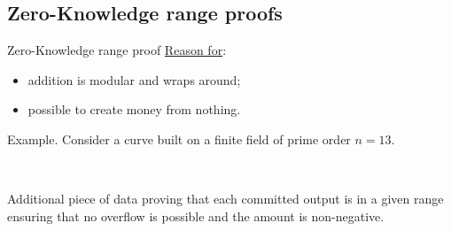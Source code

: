 \documentclass[usenames,dvipsnames]{beamer}
\begin{document}
    \subsection{Zero-Knowledge range proofs}
    \begin{frame}{Zero-Knowledge range proof}
        \underline{Reason for}:
        \begin{itemize}
            \item addition is modular and wraps around;
            \item possible to create money from nothing.
        \end{itemize}
    \begin{block}{Example.}
    Consider a curve built on a finite field of prime order $n=13$.\\ \ \\
    \end{block}
    \begin{columns}
    \begin{column}{0.5\linewidth}
    \end{column}
    \begin{column}{0.5\linewidth}
    \end{column}
    \end{columns}
    \centering Additional piece of data proving that each committed output is in a given range ensuring that no overflow is possible and the amount is non-negative.
    \end{frame}
    
\end{document}
